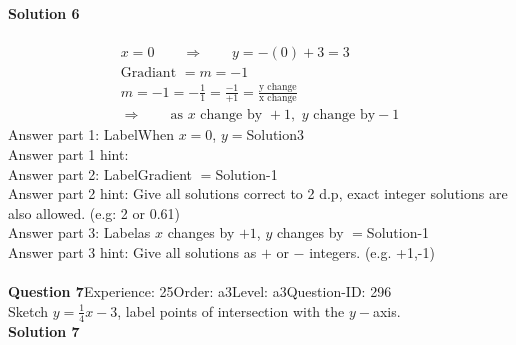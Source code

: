 \documentclass{article}
\begin{document}
\noindent\textbf{Solution 6}\\[2pt]
\\[-35pt]\begin{align*}
&x=0\qquad\Rightarrow\qquad y=-(0)+3=3&\\[2pt]
&\text{Gradiant}\,\,=m=-1&\\[2pt]
&m=-1=-\displaystyle\frac{1}{1}=\displaystyle\frac{-1}{+1}=\displaystyle\frac{\text{y change}}{\text{x change}}&\\[2pt]
& \Rightarrow\qquad \text{as}\,\, x \,\,\text{change by } +1,\,\, y\,\, \text{change by} -1 &
\end{align*}
Answer part 1: \hspace{10pt}Label\hspace{10pt}When $x=0$, $y=$\hspace{10pt}Solution\hspace{10pt}3\\
Answer part 1 hint: \hspace{15pt}\\
Answer part 2: \hspace{10pt}Label\hspace{10pt}Gradient $=$\hspace{10pt}Solution\hspace{10pt}-1\\
Answer part 2 hint: \hspace{15pt}Give all solutions correct to 2 d.p, exact integer solutions are also allowed. (e.g: 2 or 0.61)\\
Answer part 3: \hspace{10pt}Label\hspace{10pt}as $x$ changes by $+1$, $y$ changes by $=$\hspace{10pt}Solution\hspace{10pt}-1\\
Answer part 3 hint: \hspace{15pt}Give all solutions as $+$ or $-$ integers. (e.g. +1,-1)\\
\\[4pt]
\noindent\textbf{Question 7}\hspace{20pt}Experience: 25\hspace{20pt}Order: a3\hspace{20pt}Level: a3\hspace{20pt}Question-ID: 296\\[2pt]
Sketch $y=\displaystyle\frac{1}{4}x-3$, label points of intersection with the $y-$axis.\\[4pt]
\noindent\textbf{Solution 7}\\[2pt]
\end{document}
